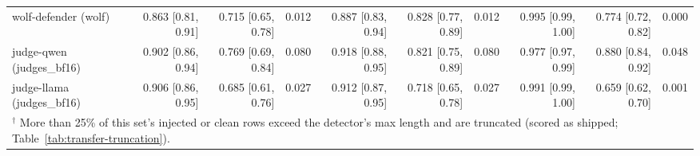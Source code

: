\begin{tabular}{lrrrrrrrrr}
wolf-defender (wolf) & 0.863 {\scriptsize[0.81, 0.91]} & 0.715 {\scriptsize[0.65, 0.78]} & 0.012 & 0.887 {\scriptsize[0.83, 0.94]} & 0.828 {\scriptsize[0.77, 0.89]} & 0.012 & 0.995 {\scriptsize[0.99, 1.00]} & 0.774 {\scriptsize[0.72, 0.82]} & 0.000 \\
judge-qwen (judges\_bf16) & 0.902 {\scriptsize[0.86, 0.94]} & 0.769 {\scriptsize[0.69, 0.84]} & 0.080 & 0.918 {\scriptsize[0.88, 0.95]} & 0.821 {\scriptsize[0.75, 0.89]} & 0.080 & 0.977 {\scriptsize[0.97, 0.99]} & 0.880 {\scriptsize[0.84, 0.92]} & 0.048 \\
judge-llama (judges\_bf16) & 0.906 {\scriptsize[0.86, 0.95]} & 0.685 {\scriptsize[0.61, 0.76]} & 0.027 & 0.912 {\scriptsize[0.87, 0.95]} & 0.718 {\scriptsize[0.65, 0.78]} & 0.027 & 0.991 {\scriptsize[0.99, 1.00]} & 0.659 {\scriptsize[0.62, 0.70]} & 0.001 \\
\bottomrule
\multicolumn{10}{l}{\scriptsize $^\dagger$ More than 25\% of this set's injected or clean rows exceed the detector's max length and are truncated (scored as shipped; Table~\ref{tab:transfer-truncation}).} \\
\end{tabular}
